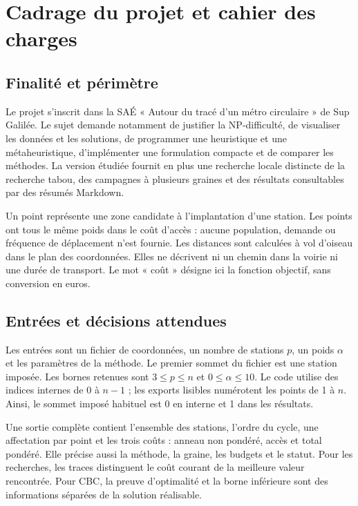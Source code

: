 \chapter{Cadrage du projet et cahier des charges}
\section{Finalité et périmètre}
Le projet s'inscrit dans la SAÉ « Autour du tracé d'un métro circulaire » de
Sup Galilée\cite{enonce}. Le sujet demande notamment de justifier la NP-difficulté,
de visualiser les données et les solutions, de programmer une heuristique et une
métaheuristique, d'implémenter une formulation compacte et de comparer les méthodes.
La version étudiée fournit en plus une recherche locale distincte de la recherche
tabou, des campagnes à plusieurs graines et des résultats consultables par des
résumés Markdown.

Un point représente une zone candidate à l'implantation d'une station. Les points
ont tous le même poids dans le coût d'accès : aucune population, demande ou
fréquence de déplacement n'est fournie. Les distances sont calculées à vol
d'oiseau dans le plan des coordonnées. Elles ne décrivent ni un chemin dans la
voirie ni une durée de transport. Le mot « coût » désigne ici la fonction objectif,
sans conversion en euros.

\section{Entrées et décisions attendues}
Les entrées sont un fichier de coordonnées, un nombre de stations $p$, un poids
$\alpha$ et les paramètres de la méthode. Le premier sommet du fichier est une
station imposée. Les bornes retenues sont $3\leq p\leq n$ et $0\leq\alpha\leq10$.
Le code utilise des indices internes de 0 à $n-1$ ; les exports lisibles numérotent
les points de 1 à $n$. Ainsi, le sommet imposé habituel est 0 en interne et 1
dans les résultats.

Une sortie complète contient l'ensemble des stations, l'ordre du cycle, une
affectation par point et les trois coûts : anneau non pondéré, accès et total
pondéré. Elle précise aussi la méthode, la graine, les budgets et le statut.
Pour les recherches, les traces distinguent le coût courant de la meilleure
valeur rencontrée. Pour CBC, la preuve d'optimalité et la borne inférieure sont
des informations séparées de la solution réalisable.


